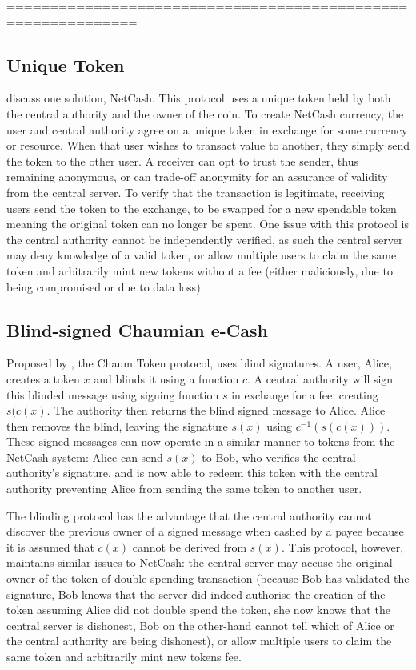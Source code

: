 =============================================================

\subsection{Unique Token}
\textcite{netcash} discuss one solution, NetCash.  This protocol uses a unique token held by both the central authority and the owner of the coin. To create NetCash currency, the user and central authority agree on a unique token in exchange for some currency or resource. When that user wishes to transact value to another, they simply send the token to the other user.  A receiver can opt to trust the sender, thus remaining anonymous, or can trade-off anonymity for an assurance of validity from the central server.  To verify that the transaction is legitimate, receiving users send the token to the exchange, to be swapped for a new spendable token meaning the original token can no longer be spent. One issue with this protocol is the central authority cannot be independently verified, as such the central server may deny knowledge of a valid token, or allow multiple users to claim the same token and arbitrarily mint new tokens without a fee (either maliciously, due to being compromised or due to data loss).

\subsection{Blind-signed Chaumian e-Cash}
Proposed by \textcite{chaum}, the Chaum Token protocol, uses blind signatures. A user, Alice, creates a token $x$ and blinds it using a function $c$.  A central authority will sign this blinded message using signing function $s$ in exchange for a fee, creating $s(c(x)$.  The authority then returns the blind signed message to Alice. Alice then removes the blind, leaving the signature $s(x)$ using $c^{-1}(s(c(x)))$.  These signed messages can now operate in a similar manner to tokens from the NetCash system: Alice can send $s(x)$ to Bob, who verifies the central authority's signature, and is now able to redeem this token with the central authority preventing Alice from sending the same token to another user.

The blinding protocol has the advantage that the central authority cannot discover the previous owner of a signed message when cashed by a payee because it is assumed that $c(x)$ cannot be derived from $s(x)$.  This protocol, however, maintains similar issues to NetCash: the central server may accuse the original owner of the token of double spending transaction (because Bob has validated the signature, Bob knows that the server did indeed authorise the creation of the token assuming Alice did not double spend the token, she now knows that the central  server is dishonest, Bob on the other-hand cannot tell which of Alice or the central authority are being dishonest), or allow multiple users to claim the same token and arbitrarily mint new tokens fee.

